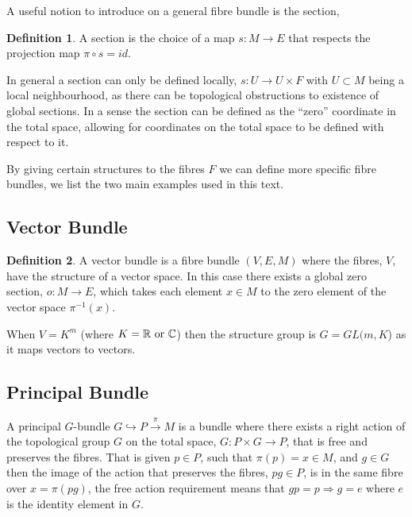 \documentclass[10pt]{report}
\theoremstyle{definition}
\newtheorem{definition}{Definition}[chapter]
\begin{document}
A useful notion to introduce on a general fibre bundle is the section, 
\begin{definition}
    A section is the choice of a map $s : M \rightarrow E$ that respects the projection map $\pi \circ s = id$.
\end{definition}
In general a section can only be defined locally, $s : U \rightarrow U \times F$ with $U \subset M$ being a local neighbourhood, as there can be topological obstructions to existence of global sections. In a sense the section can be defined as the ``zero'' coordinate in the total space, allowing for coordinates on the total space to be defined with respect to it.

By giving certain structures to the fibres $F$ we can define more specific fibre bundles, we list the two main examples used in this text.
\subsection{Vector Bundle} 
\begin{definition}
    A vector bundle is a fibre bundle $(V,E,M)$ where the fibres, $V$, have the structure of a vector space. In this case there exists a global zero section, $o : M \rightarrow E$, which takes each element $x \in M$ to the zero element of the vector space $\pi^{-1}(x)$.
\end{definition}
When $V = K^m$ (where $K = \mathbb{R}\ {\rm or}\ \mathbb{C}$) then the structure group is $G = GL(m,K$) as it maps vectors to vectors.


\subsection{Principal Bundle} 
A principal $G$-bundle $G \hookrightarrow P \overset{\pi}{\rightarrow} M$ is a bundle where there exists a right action of the topological group $G$ on the total space, $G: P \times G \rightarrow P$, that is free and preserves the fibres. That is given $p \in P$, such that $\pi(p) = x \in M$, and $g \in G$ then the image of the action that preserves the fibres, $p g \in P$, is in the same fibre over $x = \pi(p g)$, the free action requirement means that $g p = p \Rightarrow g = e$ where $e$ is the identity element in $G$.
\end{document}
